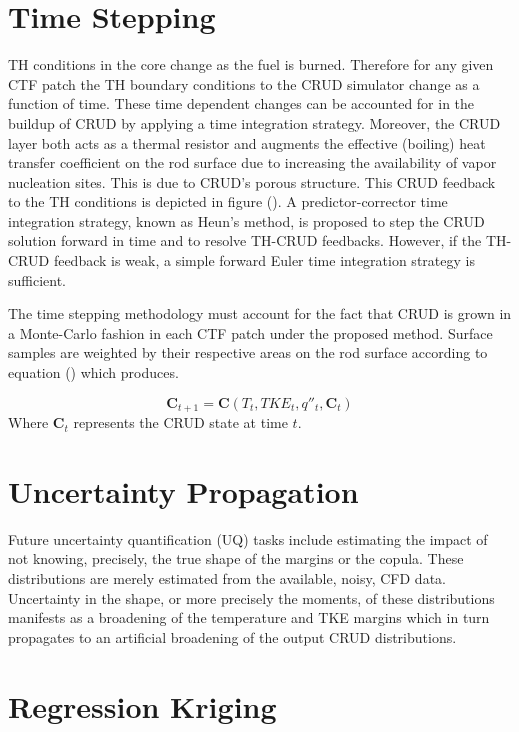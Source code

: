 \section{Time Stepping}

TH conditions in the core change as the fuel is burned.  Therefore for any given CTF patch the TH boundary conditions to the CRUD simulator change as a function of time.  These time dependent changes can be accounted for in the buildup of CRUD by applying a time integration strategy.  Moreover, the CRUD layer both acts as a thermal resistor and augments the effective (boiling) heat transfer coefficient on the rod surface due to increasing the availability of vapor nucleation sites.  This is due to CRUD's porous structure.  This CRUD feedback to the TH conditions is depicted in figure ().
A predictor-corrector time integration strategy, known as Heun's method, is proposed to step the CRUD solution forward in time and to resolve TH-CRUD feedbacks.  However, if the TH-CRUD feedback is weak, a simple forward Euler time integration strategy is sufficient.

The time stepping methodology must account for the fact that CRUD is grown in a Monte-Carlo fashion in each CTF patch under the proposed method.  Surface samples are weighted by their respective areas on the rod surface according to equation () which produces.

\begin{equation}
\mathrm{\mathbf{C}}_{t+1} = \mathrm{\mathbf{C}}(T_t, TKE_t, q''_t, \mathbf{C}_t)
\end{equation}
Where $\mathbf{C}_t$ represents the CRUD state at time $t$.  


\section{Uncertainty Propagation}

Future uncertainty quantification (UQ) tasks include estimating the impact of not knowing, precisely, the true shape of the margins or the copula.  These distributions are merely estimated from the available, noisy, CFD data.  Uncertainty in the shape, or more precisely the moments, of these distributions manifests as a broadening of the temperature and TKE margins which in turn propagates to an artificial broadening of the output CRUD distributions.

\section{Regression Kriging}


